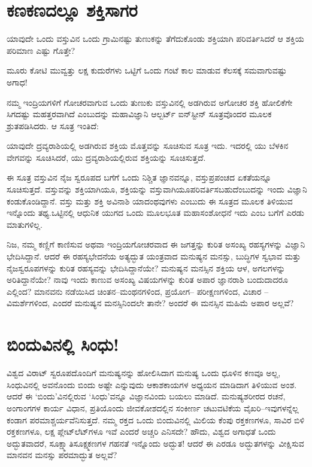 \section*{ಕಣಕಣದಲ್ಲೂ ಶಕ್ತಿಸಾಗರ}


ಯಾವುದೇ ಒಂದು ವಸ್ತುವಿನ ಒಂದು ಗ್ರಾಮಿನಷ್ಟು ತುಣುಕನ್ನು ತೆಗೆದುಕೊಂಡು ಶಕ್ತಿಯಾಗಿ ಪರಿವರ್ತಿಸಿದರೆ ಆ ಶಕ್ತಿಯ ಪರಿಮಾಣ ಎಷ್ಟು ಗೊತ್ತೇ?

ಮೂರು ಕೋಟಿ ಮುವ್ವತ್ತು ಲಕ್ಷ ಕುದುರೆಗಳು ಒಟ್ಟಿಗೆ ಒಂದು ಗಂಟೆ ಕಾಲ ಮಾಡುವ ಕೆಲಸಕ್ಕೆ ಸಮವಾಗುವಷ್ಟು ಅಗಾಧ!

ನಮ್ಮ ಇಂದ್ರಿಯಗಳಿಗೆ ಗೋಚರವಾಗುವ ಒಂದು ತುಣುಕು ವಸ್ತುವಿನಲ್ಲಿ ಅಡಗಿರುವ ಅಗೋಚರ ಶಕ್ತಿ ಹೋಲಿಕೆಗೇ ಸಿಗದಷ್ಟು ಮಹತ್ತರವಾಗಿದೆ ಎಂಬುದನ್ನು ಮಹಾವಿಜ್ಞಾನಿ ಆಲ್ಬರ್ಟ್ ಐನ್​ಸ್ಟೀನ್ ಸೂತ್ರವೊಂದರ ಮೂಲಕ ಶ್ರುತಪಡಿಸಿದರು. ಆ ಸೂತ್ರ ಇಂತಿದೆ:


ಯಾವುದೇ ದ್ರವ್ಯರಾಶಿಯಲ್ಲಿ ಅಡಗಿರುವ ಶಕ್ತಿಯ ಮೊತ್ತವನ್ನು ಸೂಚಿಸುವ ಸೂತ್ರ ಇದು. ಇದರಲ್ಲಿ ಯು ಬೆಳಕಿನ ವೇಗವನ್ನು ಸೂಚಿಸಿದರೆ,  ಯು  ದ್ರವ್ಯರಾಶಿಯಲ್ಲಿರುವ ಶಕ್ತಿಯನ್ನು ಸೂಚಿಸುತ್ತದೆ.

ಈ ಸೂತ್ರ ವಸ್ತುವಿನ ನೈಜ ಸ್ವರೂಪದ ಬಗೆಗೆ ಒಂದು ನಿಶ್ಚಿತ ಜ್ಞಾನವನ್ನೂ, ವಸ್ತುಪ್ರಪಂಚದ ಏಕತೆಯನ್ನೂ ಸೂಚಿಸುತ್ತದೆ. ವಸ್ತುವನ್ನು ಶಕ್ತಿಯಾಗಿಯೂ, ಶಕ್ತಿಯನ್ನು ವಸ್ತುವಾಗಿಯೂ\break ಪರಿವರ್ತಿಸಬಹುದೆಂಬುದನ್ನು ಇಂದು ವಿಜ್ಞಾನಿ ಕಂಡುಕೊಂಡಿದ್ದಾನೆ. ವಸ್ತು ಮತ್ತು ಶಕ್ತಿ ಅವಿನಾಶಿ ಯಾದಂಥವುಗಳು ಎಂಬುದು ಈ ಸೂತ್ರದ ಮೂಲಕ ತಿಳಿಯುವ ಇನ್ನೊಂದು ತಥ್ಯ.\break ಒಟ್ಟಿನಲ್ಲಿ ಆಧುನಿಕ ಯುಗದ ಒಂದು ಮೂಲಭೂತ ಮಹಾಸಂಶೋಧನೆ ಇದು ಎಂಬ ಬಗೆಗೆ ಎರಡು ಮಾತುಗಳಿಲ್ಲ.

ನಿಜ, ನಮ್ಮ ಕಣ್ಣಿಗೆ ಕಾಣಿಸುವ ಅಥವಾ ಇಂದ್ರಿಯಗೋಚರವಾದ ಈ ಜಗತ್ತನ್ನು ಕುರಿತ ಅಸಂಖ್ಯ ರಹಸ್ಯಗಳನ್ನು ವಿಜ್ಞಾನಿ ಭೇದಿಸಿದ್ದಾನೆ. ಆದರೆ ಈ ರಹಸ್ಯಭೇದನೆಯ ಅತ್ಯದ್ಭುತ ಯಂತ್ರವಾದ ಮನುಷ್ಯನ ಮನಸ್ಸು, ಬುದ್ಧಿಗಳ ಸ್ವಭಾವ ಮತ್ತು ನೈಜಸ್ವರೂಪಗಳನ್ನು ಕುರಿತ ರಹಸ್ಯವನ್ನು ಭೇದಿಸಿದ್ದಾನೆಯೇ? ಮನುಷ್ಯನ ಮನಸ್ಸಿನ ಶಕ್ತಿಯ ಆಳ, ಅಗಲಗಳನ್ನು ಅರಿತಿದ್ದಾನೆಯೇ? ನಾವು ಇಂದು ಕಾಣುವ ಅಸಂಖ್ಯ ವಿಷಯಗಳನ್ನು ಕುರಿತ ಅಪಾರ ಜ್ಞಾನರಾಶಿ ಬಂದುದಾದರೂ ಎಲ್ಲಿಂದ? ಮಾನವನು ನಡೆಯಿಸಿದ ಚಿಂತನ–ಮಂಥನಗಳಿಂದ, ಪ್ರಯೋಗ– ಪರೀಕ್ಷಣಗಳಿಂದ, ವಿಚಾರ – ವಿಮರ್ಶೆಗಳಿಂದ, ಎಂದರೆ ಮನುಷ್ಯನ ಮನಸ್ಸಿನಿಂದಲೇ ತಾನೇ? ಅಂದರೆ ಈ ಮನಸ್ಸಿನ ಮಹಿಮೆ ಅಪಾರ ಅಲ್ಲವೆ?


\section*{ಬಿಂದುವಿನಲ್ಲಿ ಸಿಂಧು!}


ವಿಶ್ವದ ವಿರಾಟ್ ಸ್ವರೂಪದೊಂದಿಗೆ ಮನುಷ್ಯನನ್ನು ಹೋಲಿಸಿದಾಗ ಮನುಷ್ಯ ಒಂದು ಧೂಳಿನ ಕಣವೂ ಅಲ್ಲ, ಸಿಂಧುವಿನಲ್ಲಿ ಅವನೊಂದು ಬಿಂದು ಅಷ್ಟೇ ಎನ್ನುವುದು ಆಕಾಶಕಾಯಗಳ ಅಧ್ಯಯನ ಮಾಡಿದಾಗ ತಿಳಿಯುವ ಅಂಶ. ಆದರೆ ಈ ‘ಬಿಂದು’ವಿನಲ್ಲಿರುವ ‘ಸಿಂಧು’ವನ್ನೂ ವಿಜ್ಞಾನವಿಂದು ಬಯಲು ಮಾಡಿದೆ. ಮನುಷ್ಯಶರೀರದ ರಚನೆ, ಅಂಗಾಂಗಗಳ ಕಾರ್ಯ ವಿಧಾನ, ಪ್ರತಿಯೊಂದು ಜೀವಕೋಶದಲ್ಲಿನ ಸಂಕೀರ್ಣ ಚಟುವಟಿಕೆಯ ವೈಖರಿ–ಇವುಗಳನ್ನೆಲ್ಲ ಕಂಡಾಗ ಪರಮಾಶ್ಚರ್ಯವೆನಿಸುತ್ತದೆ. ನಮ್ಮ ರಕ್ತದ ಒಂದು ಬಿಂದುವಿನಲ್ಲಿ ಮಿಲಿಯ ಕೆಂಪು ರಕ್ತಕಣಗಳೂ, ಸಾವಿರ ಬಿಳಿ ರಕ್ತಕಣಗಳೂ, ಲಕ್ಷ ಪ್ಲೇಟ್​ಲೆಟ್​ಗಳೂ ಇವೆ ಎಂದರೆ ಅಚ್ಚರಿ ಎನಿಸದೇ? ಹೌದು, ವಿಶ್ವದ ಅಗಾಧತೆ ಒಂದು ಅದ್ಭುತವಾದರೆ, ಸೂಕ್ಷ್ಮಾತಿಸೂಕ್ಷ್ಮಕಣಗಳ ಗಹನತೆ ಇನ್ನೊಂದು ಅದ್ಭುತ! ಆದರೆ ಈ ಎರಡೂ ಅದ್ಭುತಗಳನ್ನು ವೀಕ್ಷಿಸುವ ಮಾನವನ ಮನಸ್ಸು ಪರಮಾದ್ಭುತ ಅಲ್ಲವೆ?


